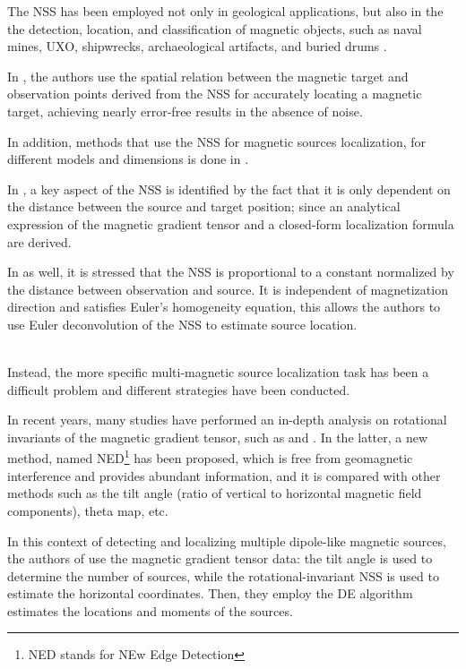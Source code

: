 The NSS has been employed not only in geological applications, but also in the  
the detection, location, and classification of magnetic objects, such as naval 
mines, UXO, shipwrecks, archaeological artifacts, and buried drums \cite{NSS_analysis2}.

In \cite{NSS_formula_important}, the authors use the spatial relation between the 
magnetic target and observation points derived from the NSS for accurately locating 
a magnetic target, achieving nearly error-free results in the absence of noise.

In addition, methods that use the NSS for magnetic sources localization, for different models
and dimensions is done in \cite{NSS_single_different_dimensions}. 

In \cite{NSS_single_localization}, a key aspect of the NSS is identified by the fact
that it is only dependent on the distance between the source and target position;
since an analytical expression of the magnetic gradient tensor and a closed-form 
localization formula are derived.

In \cite{NSS_analysis} as well, it is stressed that the NSS is proportional 
to a constant normalized by the distance between observation and source. 
It is independent of magnetization direction and satisfies Euler’s homogeneity equation, 
this allows the authors to use Euler deconvolution of the NSS to estimate source location.  

\noindent
\\
Instead, the more specific multi-magnetic source localization task 
has been a difficult problem and different strategies have been conducted.

In recent years, many studies have performed an in-depth analysis on rotational 
invariants of the magnetic gradient tensor, such as \cite{multiple_plots} and 
\cite{multiple_real_plots_invariants}.
In the latter, a new method, named NED\footnote{NED stands for NEw Edge Detection} 
has been proposed, which is free from geomagnetic interference and provides 
abundant information, and it is compared with other methods such as the tilt angle 
(ratio of vertical to horizontal magnetic field components),
theta map, etc.

In this context of detecting and localizing multiple dipole-like 
magnetic sources, the authors of \cite{multiple_DE_NSS_big_matrix} 
use the magnetic gradient tensor data:
the tilt angle is used to determine the number of sources, 
while the rotational-invariant NSS is used to estimate the horizontal coordinates. 
Then, they employ the DE algorithm estimates the locations and moments of the sources.

